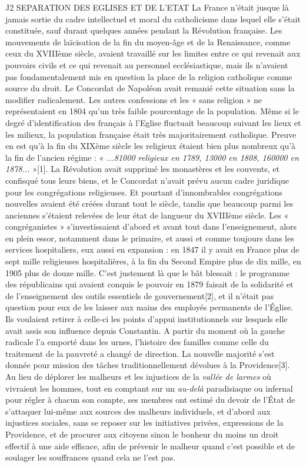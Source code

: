 J2 SEPARATION DES EGLISES ET DE L'ETAT
 La France n'était jusque là jamais sortie du cadre intellectuel et moral du catholicisme dans lequel elle s'était constituée, sauf durant quelques années pendant la Révolution française. Les mouvements de laïcisation de la fin du moyen-âge et de la Renaissance, comme ceux du XVIIIème siècle, avaient travaillé sur les limites entre ce qui revenait aux pouvoirs civils et ce qui revenait au personnel ecclésiastique, mais ils n'avaient pas fondamentalement mis en question la place de la religion catholique comme source du droit. Le Concordat de Napoléon avait remanié cette situation sans la modifier radicalement. Les autres confessions et les « sans religion » ne représentaient en 1804 qu'un très faible pourcentage de la population. Même si le degré d'identification des français à l'Eglise fluctuait beaucoup suivant les lieux et les milieux, la population française était très majoritairement catholique. Preuve en est qu'à la fin du XIXème siècle les religieux étaient bien plus nombreux qu'à la fin de l'ancien régime : « \emph{...81000 religieux en 1789, 13000 en 1808, 160000 en 1878...} »[1]. La Révolution avait supprimé les monastères et les couvents, et confisqué tous leurs biens, et le Concordat n'avait prévu aucun cadre juridique pour les congrégations religieuses. Et pourtant d'innombrables congrégations nouvelles avaient été créées durant tout le siècle, tandis que beaucoup parmi les anciennes s'étaient relevées de leur état de langueur du XVIIIème siècle. Les « congréganistes » s'investissaient d'abord et avant tout dans l'enseignement, alors en plein essor, notamment dans le primaire, et aussi et comme toujours dans les services hospitaliers, eux aussi en expansion : en 1847 il y avait en France plus de sept mille religieuses hospitalières, à la fin du Second Empire plus de dix mille, en 1905 plus de douze mille.
 C'est justement là que le bât blessait : le programme des républicains qui avaient conquis le pouvoir en 1879 faisait de la solidarité et de l'enseignement des outils essentiels de gouvernement[2], et il n'était pas question pour eux de les laisser aux mains des employés permanents de l'Église. Ils voulaient retirer à celle-ci les points d'appui institutionnels sur lesquels elle avait assis son influence depuis Constantin. A partir du moment où la gauche radicale l'a emporté dans les urnes, l'histoire des familles comme celle du traitement de la pauvreté a changé de direction. La nouvelle majorité s'est donnée pour mission des tâches traditionnellement dévolues à la Providence[3]. Au lieu de déplorer les malheurs et les injustices de la \emph{vallée de larmes} où vivraient les hommes, tout en comptant sur un \emph{au-delà} paradisiaque ou infernal pour régler à chacun son compte, ses membres ont estimé du devoir de l'État de s'attaquer lui-même aux sources des malheurs individuels, et d'abord aux injustices sociales, sans se reposer sur les initiatives privées, expressions de la Providence, et de procurer aux citoyens sinon le bonheur du moins un droit effectif à une aide efficace, afin de prévenir le malheur quand c'est possible et de soulager les souffrances quand cela ne l'est pas. 
